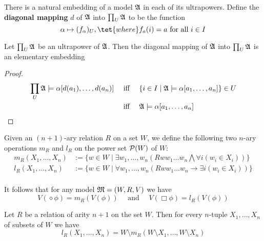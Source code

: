 \documentclass[11pt]{article}
\begin{document}
There is a natural embedding of a model \(\mathfrak{A}\) in each of its ultrapowers.
Define the \textbf{diagonal mapping} \(d\) of \(\mathfrak{A}\) into \(\prod_U\mathfrak{A}\) to be the
function
\begin{equation*}
\alpha\mapsto(f_\alpha)_U,\tet{ where }f_a(i)=a\text{ for all }i\in I
\end{equation*}

\begin{corollary}[]
Let \(\prod_U\mathfrak{A}\) be an ultrapower of \(\mathfrak{A}\). Then the diagonal mapping of
\(\mathfrak{A}\) into \(\prod_U\mathfrak{A}\) is an elementary embedding
\end{corollary}

\begin{proof}
\begin{align*}
\prod_U\mathfrak{A}\models\alpha[d(a_1),\dots,d(a_n)]&\quad\text{ iff }\quad
\{i\in I\mid\mathfrak{A}\models\alpha[a_1,\dots,a_n]\}\in U\\
&\quad\text{ iff }\quad \mathfrak{A}\models\alpha[a_1,\dots,a_n]
\end{align*}
\end{proof}




\begin{definition}[]
Given an \((n+1)\)-ary relation \(R\) on a set \(W\), we define the
following two \(n\)-ary operations \(m_R\) and \(l_R\) on the power set
\(\mathcal{P}(W)\) of \(W\):
\begin{align*}
m_R(X_1,\dots,X_n)&:=\{w\in W\mid\exists w_1,\dots,w_n
(Rww_1\dots w_n\bigwedge\forall i(w_i\in X_i))\}\\
l_R(X_1,\dots,X_n)&:=\{w\in W\mid\forall w_1,\dots,w_n
(Rww_1\dots w_n\to\exists i(w_i\in X_i))\}\\
\end{align*}
\end{definition}

It follows that for any  model \(\mathfrak{M}=(W,R,V)\) we have
\begin{equation*}
V(\diamond\phi)=m_R(V(\phi))\quad\text{ and }\quad
V(\Box\phi)=l_R(V(\phi))
\end{equation*}

\begin{proposition}[]
Let \(R\) be a relation of arity \(n+1\) on the set \(W\). Then for every
\(n\)-tuple \(X_1,\dots,X_n\) of subsets of \(W\) we have
\begin{equation*}
l_R(X_1,\dots,X_n)=W\setminus m_R(W\setminus X_1,\dots,W\setminus X_n)
\end{equation*}
\end{proposition}
\end{document}
